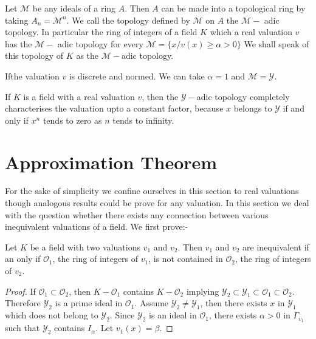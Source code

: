 Let $\mathcal{M}$ be any ideals of a ring $A$. Then $A$ can be made
into a topological ring by taking $A_{n} = \mathcal{M}^{n}$. We call
the topology defined by $\mathcal{M}$ on $A$ the $\mathcal{M}-$ adic
topology. In particular the ring of integers of a field $K$ which a
real valuation $v$ has the $\mathcal{M}-$ adic topology for every
$\mathcal{M} = \{x / v(x) \ge \alpha > 0\}$ We shall speak of this
topology of $K$ as the $\mathcal{M}-$adic topology.   

If\pageoriginale the valuation $v$ is discrete and normed. We can take $\alpha = 1$
and $\mathcal{M} = \mathscr{Y}$. 

\begin{remark}\label{part1:chap1:sec3:rem3} %
  If $K$ is a field with a real valuation $v$, then the
  $\mathscr{Y}-$adic topology completely characterises the valuation
  upto a constant factor, because $x$ belongs to $\mathscr{Y}$ if and
  only if $x^{n}$ tends to zero as $n$ tends to infinity.     
\end{remark} 

\section{Approximation Theorem}\label{part1:chap1:sec4} %
 
For the sake of simplicity we confine ourselves in this section to
real valuations though analogous results could be prove for any
valuation. In this section we deal with the question whether there
exists any connection between various inequivalent valuations of a
field. We first prove:-   
 
\begin{Lemma}\label{part1:chap1:sec4:lem1} %
  Let $K$ be a field with two valuations $v_{1}$ and $v_{2}$. Then
  $v_{1}$ and $v_{2}$ are inequivalent if an only if
  $\mathscr{O}_{1}$, the ring of integers of $v_{1}$, is not contained
  in $\mathscr{O}_{2}$, the ring of integers of $v_{2}$.  
\end{Lemma} 
 
\begin{proof}
  If $\mathscr{O}_{1} \subset \mathscr{O}_{2}$, then
  $K-\mathscr{O}_{1}$ contains $K-\mathscr{O}_{2}$ implying
  $\mathscr{Y}_{2} \subset\mathscr{Y}_{1} \subset \mathscr{O}_{1}
  \subset \mathscr{O}_{2}$. Therefore $\mathscr{Y}_{2}$ is a prime
  ideal in $\mathscr{O}_{1}$. Assume $\mathscr{Y}_{2} \neq
  \mathscr{Y}_{1}$, then there exists $x$ in $\mathscr{Y}_{1}$ which
  does not belong to $\mathscr{Y}_{2}$. Since $\mathscr{Y}_{2}$ is an
  ideal in $\mathscr{O}_{1}$, there exists $\alpha > 0$ in
  $\Gamma_{v_{1}}$ such that $\mathscr{Y}_{2}$ contains
  $I_{\alpha}$. Let $v_{1}(x) =\beta$.
\end{proof} 
 
